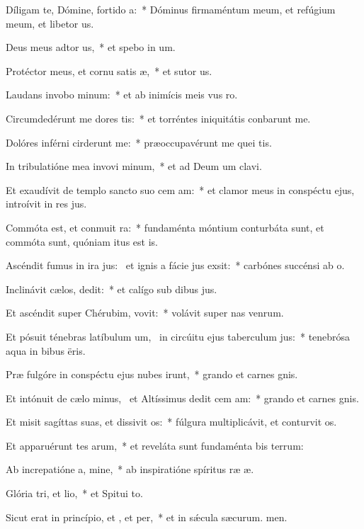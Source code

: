 \item Díligam te, Dómine, fortido a:~* Dóminus firmaméntum meum, et refúgium meum, et libetor us.
\item Deus meus adtor us,~* et spebo in um.
\item Protéctor meus, et cornu satis æ,~* et sutor us.
\item Laudans invobo minum:~* et ab inimícis meis vus ro.
\item Circumdedérunt me dores tis:~* et torréntes iniquitátis conbarunt me.
\item Dolóres inférni cirderunt me:~* præoccupavérunt me quei tis.
\item In tribulatióne mea invovi minum,~* et ad Deum um clavi.
\item Et exaudívit de templo sancto suo cem am:~* et clamor meus in conspéctu ejus, introívit in res jus.
\item Commóta est, et conmuit ra:~* fundaménta móntium conturbáta sunt, et commóta sunt, quóniam itus est is.
\item Ascéndit fumus in ira jus:~\pscross{} et ignis a fácie jus exsit:~* carbónes succénsi  ab o.
\item Inclinávit cælos,  dedit:~* et calígo sub dibus jus.
\item Et ascéndit super Chérubim,  vovit:~* volávit super nas venrum.
\item Et pósuit ténebras latíbulum um,~\pscross{} in circúitu ejus taberculum jus:~* tenebrósa aqua in bibus ëris.
\item Præ fulgóre in conspéctu ejus nubes irunt,~* grando et carnes gnis.
\item Et intónuit de cælo minus,~\pscross{} et Altíssimus dedit cem am:~* grando et carnes gnis.
\item Et misit sagíttas suas, et dissivit os:~* fúlgura multiplicávit, et conturvit os.
\item Et apparuérunt tes arum,~* et reveláta sunt fundaménta bis terrum:
\item Ab increpatióne a, mine,~* ab inspiratióne spíritus ræ æ.
\item Glória tri, et lio,~* et Spitui to.
\item Sicut erat in princípio, et , et per,~* et in sǽcula sæcurum. men.

